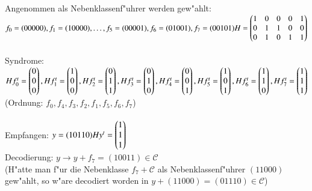 Angenommen als Nebenklassenf"uhrer werden gew"ahlt:\\
$ f_0=(00000), f_1=(10000), \ldots, f_5=(00001), f_6=(01001), f_7=(00101) \\
\\
H =
\begin{pmatrix}
1 & 0 & 0 & 0 & 1\\
0 & 1 & 1 & 0 & 0\\
0 & 1 & 0 & 1 & 1\\
\end{pmatrix}$\\
\\
Syndrome:\\
$Hf^t_0=\begin{pmatrix}0 \\ 0 \\ 0 \end{pmatrix},
Hf^t_1=\begin{pmatrix}1 \\ 0 \\ 0 \end{pmatrix},
Hf^t_2=\begin{pmatrix}0 \\ 1 \\ 1 \end{pmatrix},
Hf^t_3=\begin{pmatrix}0 \\ 1 \\ 0 \end{pmatrix},
Hf^t_4=\begin{pmatrix}0 \\ 0 \\ 1 \end{pmatrix},\\
Hf^t_5=\begin{pmatrix}1 \\ 0 \\ 1 \end{pmatrix},
Hf^t_6=\begin{pmatrix}1 \\ 1 \\ 0 \end{pmatrix},
Hf^t_7=\begin{pmatrix}1 \\ 1 \\ 1 \end{pmatrix}$\\
(Ordnung: $f_0, f_4, f_3, f_2, f_1, f_5, f_6, f_7$)\\
\\
Empfangen: $y=(10110) \\
Hy^t=\begin{pmatrix} 1 \\ 1 \\ 1 \end{pmatrix}$ \\
Decodierung: $y \rightarrow y + f_7 = (10011) \in \mathcal{C}$\\
(H"atte man f"ur die Nebenklasse $f_7 + \mathcal{C}$ als Nebenklassenf"uhrer $(11000)$ gew"ahlt, so w"are decodiert worden in $y + (11000) = (01110) \in \mathcal{C}$)

